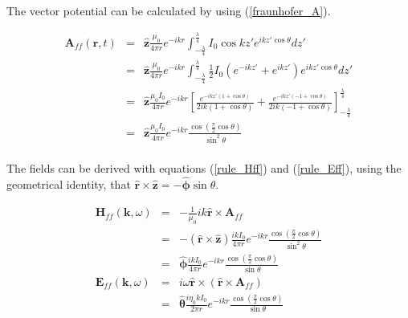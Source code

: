 \documentclass[a4paper,10pt]{thesis}
\begin{document}
\paragraph*{}
The vector potential can be calculated by using (\ref{fraunhofer_A}).

\begin{eqnarray}\label{hwd_A_solution}
 \mathbf{A}_{ff}(\mathbf{r},t) &=&\mathbf{ \hat{z}} \frac{\mu_0}{4 \pi r} e^{-ikr} \int_{-\frac{\lambda}{4}}^{\frac{\lambda}{4}} I_0 \cos kz' e^{ikz'\cos \theta } dz'\\
&=& \mathbf{\hat{z}} \frac{\mu_0}{4 \pi r} e^{-ikr} \int_{-\frac{\lambda}{4}}^{\frac{\lambda}{4}} \frac{1}{2} I_0 (e^{-ikz'}+e^{ikz'}) e^{ikz'\cos \theta } dz'\nonumber \\
&=& \mathbf{\hat{z} }\frac{\mu_0 I_0}{4 \pi r} e^{-ikr} \left[ \frac{e^{-ikz' (1+ \cos \theta ) }}{2ik(1+ \cos \theta )} + \frac{e^{-ikz' (-1+ \cos \theta )} }{2ik(-1+ \cos \theta )} \right]_{-\frac{\lambda}{4}}^{\frac{\lambda}{4}} \nonumber \\
&=& \mathbf{\hat{z}} \frac{\mu_0 I_0}{4 \pi r} e^{-ikr} \frac{\cos (\frac{\pi}{2} \cos \theta)}{\sin^2 \theta} \nonumber
\end{eqnarray}

\paragraph*{}
The fields can be derived with equations (\ref{rule_Hff}) and (\ref{rule_Eff}), using the geometrical identity, that $\mathbf{\hat{r}} \times \mathbf{\hat{z}}=- \mathbf{\hat{\phi}} \sin \theta$.

\begin{eqnarray}
\mathbf{H}_{ff} (\mathbf{k},\omega)&=&  - \frac{1}{\mu_0} ik\mathbf{\hat{r}} \times \mathbf{A}_{ff} \label{hwd_Hff} \\
&=& -(\mathbf{\hat{r} }\times\mathbf{ \hat{z}})  \frac{ik I_0}{4 \pi r} e^{-ikr} \frac{\cos (\frac{\pi}{2} \cos \theta)}{\sin^2 \theta}\nonumber \\
&=& \mathbf{\hat{\phi}}  \frac{ik I_0}{4 \pi r} e^{-ikr} \frac{\cos (\frac{\pi}{2} \cos \theta)}{\sin \theta} \nonumber \\
\mathbf{E}_{ff} (\mathbf{k},\omega)&=&  i \omega \mathbf{\hat{r}} \times ( \mathbf{\hat{r}} \times \mathbf{A}_{ff}) \label{hwd_Eff} \\
&=& \mathbf{\hat{\theta}} \frac{i \eta_0 k I_0}{2 \pi r} e^{-ikr} \frac{\cos (\frac{\pi}{2} \cos \theta)}{\sin \theta} \nonumber
\end{eqnarray}
\end{document}

